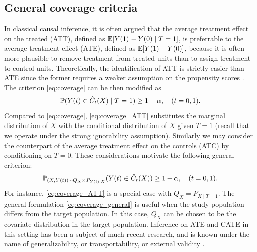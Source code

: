 \subsection{General coverage criteria}\label{subsec:general_criterion}
In classical causal inference, it is often argued that the average
treatment effect on the treated (ATT), defined as
$\E [Y(1) - Y(0)\mid T = 1]$, is preferrable to the average
treatment effect (ATE), defined as $\E [Y(1) - Y(0)]$, %
because it is often more plausible to remove treatment from treated units than to assign treatment to control units. Theoretically, the identification of ATT is strictly easier than ATE since the former requires a weaker assumption on the propensity scores \citep[e.g.][]{imbens2015causal}. 
The criterion \eqref{eq:coverage} can be then modified as
\begin{equation}
  \label{eq:coverage_ATT}
  \P(Y(t) \in \hat{C}_{t}(X) \mid T = 1)\ge 1 - \alpha, \quad (t = 0, 1).
\end{equation}
Compared to \eqref{eq:coverage}, \eqref{eq:coverage_ATT} substitutes
the marginal distribution of $X$ with the conditional distribution of
$X$ given $T = 1$ (recall that we operate under the strong
ignorability assumption). Similarly we may consider the counterpart of
the average treatment effect on the controls (ATC) by conditioning on
$T = 0$. These considerations motivate the following general
criterion:
\begin{equation}
  \label{eq:coverage_general}
    \P_{(X, Y(t))\sim Q_{X}\times P_{Y(t)\mid X}}(Y(t) \in \hat{C}_{t}(X))\ge 1 - \alpha, \quad (t = 0, 1).
  \end{equation}
  For instance, \eqref{eq:coverage_ATT} is a special case with
  $Q_{X} = P_{X\mid T = 1}$. The general formulation
  \eqref{eq:coverage_general} is useful when the study population
  differs from the target population. In this case, $Q_{X}$ can be
  chosen to be the covariate distribution in the target
  population. Inference on ATE and CATE in this setting has been a
  subject of much recent research, and is known under the name of
  generalizability, or transportability, or external validity
  \citep[e.g.][]{tipton2013improving, pearl2014external}.

